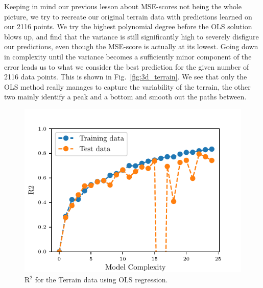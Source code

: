 \documentclass[reprint, english, nofootinbib]{revtex4-2}
\begin{document}
Keeping in mind our previous lesson about MSE-scores not being the whole picture, we try to recreate our original terrain data with predictions learned on our 2116 points. We try the highest polynomial degree before the OLS solution blows up, and find that the variance is still significantly high to severely disfigure our predictions, even though the MSE-score is actually at its lowest. Going down in complexity until the variance becomes a sufficiently minor component of the error leads us to what we consider the best prediction for the given number of 2116 data points. This is shown in Fig.~\ref{fig:3d_terrain}. We see that only the OLS method really manages to capture the variability of the terrain, the other two mainly identify a peak and a bottom and smooth out the paths between.







\begin{figure}
   \center
   \includegraphics[width=\columnwidth]{R2_terrain_data.pdf}
   \caption{R$^2$ for the Terrain data using OLS regression.}
\end{figure}
\end{document}
